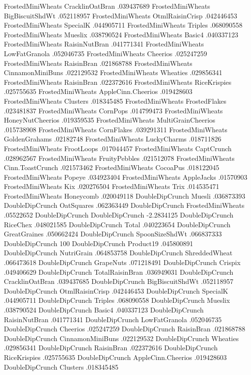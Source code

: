 FrostedMiniWheats	CracklinOatBran	.039437689
FrostedMiniWheats	BigBiscuitShdWt	.052118957
FrostedMiniWheats	OtmlRaisinCrisp	.042446453
FrostedMiniWheats	SpecialK	.044905711
FrostedMiniWheats	Triples	.068090558
FrostedMiniWheats	Mueslix	.038790524
FrostedMiniWheats	Basic4	.040337123
FrostedMiniWheats	RaisinNutBran	.041771341
FrostedMiniWheats	LowFatGranola	.052046735
FrostedMiniWheats	Cheerios	.025247259
FrostedMiniWheats	RaisinBran	.021868788
FrostedMiniWheats	CinnamonMiniBuns	.022129532
FrostedMiniWheats	Wheaties	.029856341
FrostedMiniWheats	RaisinBran	.022372616
FrostedMiniWheats	RiceKrispies	.025755635
FrostedMiniWheats	AppleCinn.Cheerios	.019428603
FrostedMiniWheats	Clusters	.018345485
FrostedMiniWheats	FrostedFlakes	.023481837
FrostedMiniWheats	CornPops	.014799473
FrostedMiniWheats	HoneyNutCheerios	.019359535
FrostedMiniWheats	MultiGrainCheerios	.015738908
FrostedMiniWheats	CornFlakes	.039291311
FrostedMiniWheats	GoldenGrahams	.02182748
FrostedMiniWheats	LuckyCharms	.018711826
FrostedMiniWheats	FrootLoops	.017044457
FrostedMiniWheats	CaptCrunch	.028962567
FrostedMiniWheats	FruityPebbles	.021512078
FrostedMiniWheats	Cinn.ToastCrunch	.021573462
FrostedMiniWheats	CocoaPus	.018122045
FrostedMiniWheats	Popeye	.034923404
FrostedMiniWheats	AppleJacks	.01570903
FrostedMiniWheats	Kix	.020276504
FrostedMiniWheats	Trix	.014535471
FrostedMiniWheats	Honeycomb	.020049118
DoubleDipCrunch	Muesli	.036873393
DoubleDipCrunch	OatSquares	.062363449
DoubleDipCrunch	FrostedMiniWheats	.05522652
DoubleDipCrunch	DoubleDipCrunch	-2.2834125
DoubleDipCrunch	RiceChex	.048021585
DoubleDipCrunch	Total	.040223654
DoubleDipCrunch	GreatGraines	.050662424
DoubleDipCrunch	SpoonSizeShdWt	.066837333
DoubleDipCrunch	100%
DoubleDipCrunch	Product19	.045800891
DoubleDipCrunch	NutriGrain	.064853758
DoubleDipCrunch	ShreddedWheat	.066473618
DoubleDipCrunch	GrapeNuts	.071218491
DoubleDipCrunch	Crispix	.049406629
DoubleDipCrunch	TotalRaisinBran	.036949031
DoubleDipCrunch	CracklinOatBran	.039437685
DoubleDipCrunch	BigBiscuitShdWt	.052118957
DoubleDipCrunch	OtmlRaisinCrisp	.042446453
DoubleDipCrunch	SpecialK	.044905711
DoubleDipCrunch	Triples	.068090558
DoubleDipCrunch	Mueslix	.038790524
DoubleDipCrunch	Basic4	.040337123
DoubleDipCrunch	RaisinNutBran	.041771341
DoubleDipCrunch	LowFatGranola	.052046735
DoubleDipCrunch	Cheerios	.025247259
DoubleDipCrunch	RaisinBran	.021868788
DoubleDipCrunch	CinnamonMiniBuns	.022129532
DoubleDipCrunch	Wheaties	.029856341
DoubleDipCrunch	RaisinBran	.022372616
DoubleDipCrunch	RiceKrispies	.025755635
DoubleDipCrunch	AppleCinn.Cheerios	.019428603
DoubleDipCrunch	Clusters	.018345485
